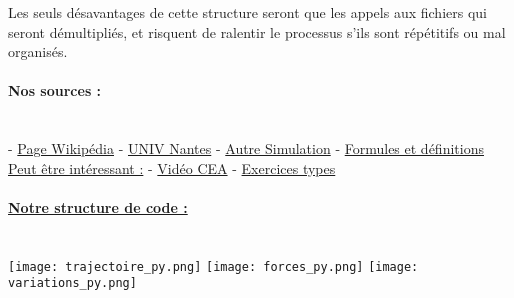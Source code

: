 \documentclass[a4paper,11pt]{article}			%
\begin{document}
Les seuls désavantages de cette structure seront que les appels aux fichiers qui seront démultipliés, et risquent de ralentir le processus s'ils sont répétitifs ou mal organisés.

\paragraph{Nos sources :}
~~\\
\tabto{1cm} - \href{https://fr.wikipedia.org/wiki/Acc\%C3\%A9l\%C3\%A9rateur_de_particules}{Page Wikipédia}
\newline
\tabto{1cm} - \href {https://www.sciences.univ-nantes.fr/sites/genevieve_tulloue/Meca/Charges/cyclotron.php}{UNIV Nantes}
\newline
\tabto{1cm} - \href{https://virtuelle-experimente.de/fr/b-feld/anwendung/zyklotron.php}{Autre Simulation}
\newline
\tabto{1cm} - \href {https://www.techno-science.net/definition/8098.html}{Formules et définitions}
\newline
\underline{Peut être intéressant :}
\newline
\tabto{1cm} - \href{https://www.cea.fr/multimedia/Pages/videos/culture-scientifique/technologies/cyclotron.aspx}{Vidéo CEA}
\newline
\tabto{1cm} - \href{http://physik.diekirch.org/1er/A05\%20Mouvement\%20dans\%20B.pdf}{Exercices types}
\newpage
\paragraph{\underline{Notre structure de code :}}
~~\\
\newline
\texttt{[image: trajectoire\_py.png]}
\newline
\texttt{[image: forces\_py.png]}
\newline
\texttt{[image: variations\_py.png]}
\end{document}
